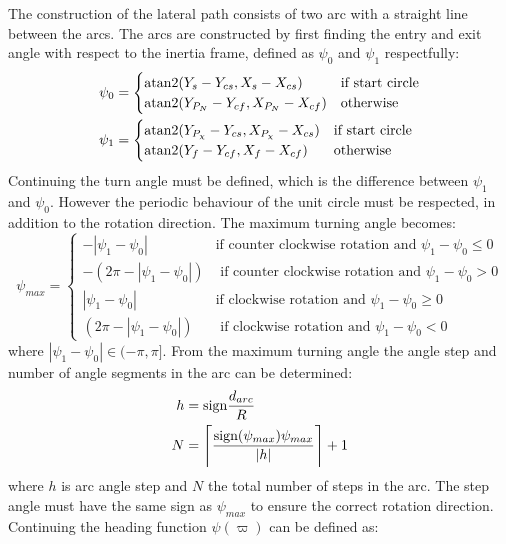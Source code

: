 The construction of the lateral path consists of two arc with a straight line between the arcs. The arcs are constructed by first finding the entry and exit angle with respect to the inertia frame, defined as $\psi_0$ and $\psi_1$ respectfully:
\begin{subequations}
\begin{align}
\psi_0 &= \begin{cases}
\atan2(Y_s-Y_{cs},X_s-X_{cs}) & \text{if start circle} \\
\atan2(Y_{P_N}-Y_{cf},X_{P_N}-X_{cf}) & \text{otherwise}
\end{cases}\\
\psi_1 &= \begin{cases}
\atan2(Y_{P_\chi}-Y_{cs},X_{P_{\chi}}-X_{cs}) & \text{if start circle} \\
\atan2(Y_{f}-Y_{cf},X_{f}-X_{cf}) & \text{otherwise}
\end{cases}
\end{align}
\end{subequations}
Continuing the turn angle must be defined, which is the difference between $\psi_1$ and $\psi_0$. However the periodic behaviour of the unit circle must be respected, in addition to the rotation direction. The maximum turning angle becomes:
\begin{equation}
\psi_{max} = \begin{cases}
-|\psi_1 - \psi_0| & \text{if counter clockwise rotation and } \psi_1 - \psi_0 \leq 0 \\
-(2\pi - |\psi_1-\psi_0|) & \text{ if counter clockwise rotation and } \psi_1 - \psi_0 > 0 \\
|\psi_1 - \psi_0| & \text{if clockwise rotation and } \psi_1 - \psi_0 \geq 0 \\
(2\pi - |\psi_1-\psi_0|) & \text{ if clockwise rotation and } \psi_1 - \psi_0 < 0
\end{cases}
\end{equation}
where $|\psi_1-\psi_0| \in(-\pi,\pi]$. From the maximum turning angle the angle step and number of angle segments in the arc can be determined:
\begin{subequations}
\begin{align}
h &= \text{sign}\frac{d_{arc}}{R} \\
N &= \ceil[\Bigg]{\frac{\text{sign}(\psi_{max})\psi_{max}}{|h|}} + 1
\end{align}
\end{subequations}
where $h$ is arc angle step and $N$ the total number of steps in the arc. The step angle must have the same sign as $\psi_{max}$ to ensure the correct rotation direction. Continuing the heading function $\psi(\varpi)$ can be defined as:

